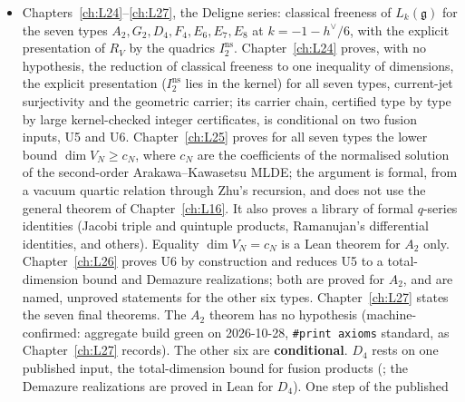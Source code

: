 \begin{description}
\begin{itemize}
    non-critical level; Lie data for every finite-dimensional simple $\mathfrak g$ given a
    nondegenerate symmetric invariant form; the simple quotient $L_k(\mathfrak g)$,
    simple, with weight one spanned by the currents; and concrete simple Lie algebras in Lean:
    $\mathfrak{sl}_n$, the simply-laced $\mathfrak{sl}_3,\mathfrak{so}_8,\mathfrak e_6,\mathfrak e_7,
    \mathfrak e_8$ as weight-one spaces of lattice VOAs, and $\mathfrak g_2,\mathfrak f_4,\mathfrak e_6$ from
    kernel-checked structure constants. These results are unconditional. That the algebras are of the
    named Cartan type is not claimed (the classification of simple Lie algebras is not formalized).
  \item Chapters~\ref{ch:L24}--\ref{ch:L27}, the Deligne series: classical freeness of $L_k(\mathfrak g)$
    for the seven types $A_2,G_2,D_4,F_4,E_6,E_7,E_8$ at $k=-1-h^\vee/6$, with the explicit presentation
    of $R_V$ by the quadrics $I_2^{\mathrm{ns}}$. Chapter~\ref{ch:L24} proves, with no hypothesis, the
    reduction of classical freeness to one inequality of dimensions, the explicit presentation
    ($I_2^{\mathrm{ns}}$ lies in the kernel) for all seven types, current-jet surjectivity and the
    geometric carrier; its carrier chain, certified type by type by large kernel-checked integer
    certificates, is conditional on two fusion inputs, U5 and U6. Chapter~\ref{ch:L25} proves for all
    seven types the lower bound $\dim V_N\ge c_N$, where $c_N$ are the coefficients of the normalised
    solution of the second-order Arakawa--Kawasetsu MLDE; the argument is formal, from a vacuum quartic
    relation through Zhu's recursion, and does not use the general theorem of Chapter~\ref{ch:L16}. It
    also proves a library of formal $q$-series identities (Jacobi triple and quintuple products,
    Ramanujan's differential identities, and others). Equality $\dim V_N=c_N$ is a Lean theorem for $A_2$
    only. Chapter~\ref{ch:L26} proves U6 by construction and reduces U5 to a total-dimension bound and
    Demazure realizations; both are proved for $A_2$, and are named, unproved statements for the other six types.
    Chapter~\ref{ch:L27} states the seven final theorems. The $A_2$ theorem has no hypothesis (machine-confirmed: aggregate build green on 2026-10-28, \texttt{\#print axioms} standard, as
    Chapter~\ref{ch:L27} records). The
    other six are \textbf{conditional}. $D_4$ rests on one published input, the total-dimension bound for fusion products
    (; the Demazure realizations are proved in Lean for $D_4$). One step of the published

\end{itemize}
\end{description}

